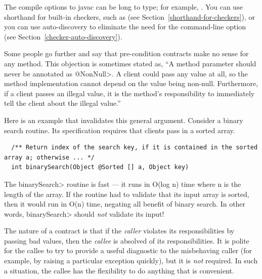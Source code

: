 \begin{sloppypar}
The compile options to javac can be long to type; for example,
.
You can use shorthand for built-in checkers, such as  (see Section~\ref{shorthand-for-checkers}), or you can use
auto-discovery to eliminate the need for the  command-line
option (see Section~\ref{checker-auto-discovery}).
\end{sloppypar}



Some people go further and say that pre-condition contracts make no sense
for any method.  This objection is sometimes stated as, ``A method parameter
should never be annotated as \<@NonNull>.  A client could pass any value at
all, so the method implementation cannot depend on the value being
non-null.  Furthermore, if a client passes an illegal value, it is the
method's responsibility to immediately tell the client about the illegal
value.''

Here is an example that invalidates this general argument.  Consider a
binary search routine.  Its specification requires that clients pass in a
sorted array.

\begin{smaller}
\begin{Verbatim}
  /** Return index of the search key, if it is contained in the sorted array a; otherwise ... */
  int binarySearch(Object @Sorted [] a, Object key)
\end{Verbatim}
\end{smaller}

The \<binarySearch> routine is fast --- it runs in O(log n) time where n is
the length of the array.  If the routine had to validate that its input
array is sorted, then it would run in O(n) time, negating all benefit of
binary search.  In other words, \<binarySearch> should \emph{not} validate
its input!

The nature of a contract is that if the \emph{caller} violates its
responsibilities by passing bad values, then the \emph{callee} is absolved
of its responsibilities.  It is polite for the callee to try to provide a
useful diagnostic to the misbehaving caller (for example, by raising a
particular exception quickly), but it is \emph{not} required.  In such a
situation, the callee has the flexibility to do anything that is
convenient.

